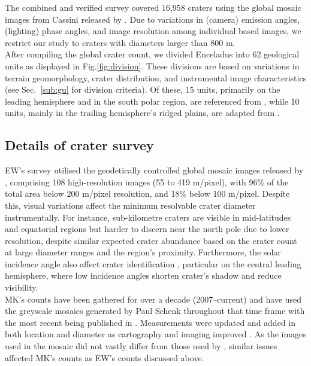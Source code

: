 \documentclass[preprint,11pt,3p,times,authoryear]{elsarticle}
\begin{document}
The combined and verified survey covered 16,958 craters using the global mosaic images from Cassini released by \citet{Bland2018}. Due to variations in (camera) emission angles, (lighting) phase angles, and image resolution among individual based images, we restrict our study to craters with diameters larger than 800 m. \\

After compiling the global crater count, we divided Enceladus into 62 geological units as displayed in  Fig.\ref{fig:division}. These divisions are based on variations in terrain geomorphology, crater distribution, and instrumental image characteristics (see Sec.~\ref{sub:gu} for division criteria).
Of these, 15 units, primarily on the leading hemisphere and in the south polar region, are referenced from \citet{CrowWillard2015}, while 10 units, mainly in the trailing hemisphere’s ridged plains, are adapted from \citet{Kirchoff2009}. \\

\subsection{Details of crater survey}
\label{sub:survey}
EW’s survey utilised the geodetically controlled global mosaic images released by \citet{Bland2018}, comprising 108 high-resolution images (55 to 419 m/pixel), with 96\% of the total area below 200 m/pixel resolution, and 18\% below 100 m/pixel. Despite this, visual variations affect the minimum resolvable crater diameter instrumentally. For instance, sub-kilometre craters are visible in mid-latitudes and equatorial regions but harder to discern near the north pole due to lower resolution, despite similar expected crater abundance based on the crater count at large diameter ranges and the region’s proximity. Furthermore, the solar incidence angle also affect crater identification \citep{Ostrach2011}, particular on the central leading hemisphere, where low incidence angles shorten crater's shadow and reduce visibility.\\

MK's counts have been gathered for over a decade (2007–current) and have used the greyscale mosaics generated by Paul Schenk throughout that time frame \citep{Schenk2011,Schenk2018} with the most recent being published in \citet{Schenk2024}. Measurements were updated and added in both location and diameter as cartography and imaging improved \citet{Kirchoff2016,Kirchoff2018}. As the images used in the mosaic did not vastly differ from those used by \citet{Bland2018}, similar issues affected MK's counts as EW's counts discussed above.\\
\end{document}
